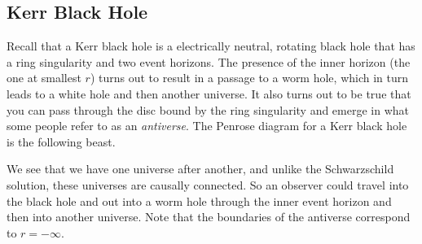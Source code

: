 \subsection{Kerr Black Hole}

Recall that a Kerr black hole is a electrically neutral, rotating black hole that has a ring singularity and two event horizons. The presence of the inner horizon (the one at smallest $r$) turns out to result in a passage to a worm hole, which in turn leads to a white hole and then another universe. It also turns out to be true that you can pass through the disc bound by the ring singularity and emerge in what some people refer to as an \textit{antiverse}. The Penrose diagram for a Kerr black hole is the following beast. 

We see that we have one universe after another, and unlike the Schwarzschild solution, these universes are causally connected. So an observer could travel into the black hole and out into a worm hole through the inner event horizon and then into another universe. Note that the boundaries of the antiverse correspond to $r=-\infty$.

